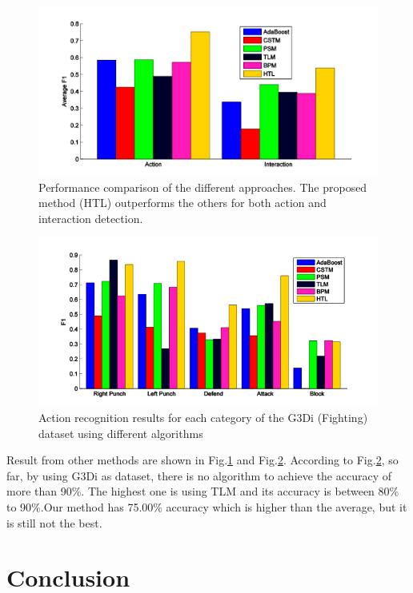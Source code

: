 \documentclass[runningheads,a4paper]{llncs}
\begin{document}
	\begin{figure}[htbp]
	\centering
	\includegraphics[scale=0.8]{previous-1.png}
	\caption{ Performance comparison of the different approaches. The proposed method (HTL) outperforms the others for both action and interaction detection. }
	\label{fig:p-1}
	\end{figure}

	\begin{figure}[htbp]
	\centering
	\includegraphics[scale=0.48]{previous-2.png}
	\caption{ Action recognition results for each category of the G3Di (Fighting) dataset using different algorithms
	 }
	\label{fig:p-2}
	\end{figure}

	Result from other methods are shown in Fig.\ref{fig:p-1} and Fig.\ref{fig:p-2}. According to Fig.\ref{fig:p-2}, so far, by using G3Di as dataset, there is no algorithm to achieve the accuracy of more than 90\%. The highest one is using TLM and its accuracy is between 80\% to 90\%.Our method has 75.00\% accuracy which is higher than the average, but it is still not the best. 

	\vbox{}
	\vbox{}
	\vbox{}
	\vbox{}
	\vbox{}
	\vbox{}
	\vbox{}
	\vbox{}

\section{Conclusion}
\end{document}
